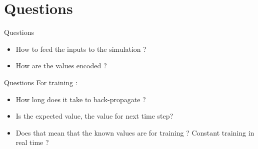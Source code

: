 \documentclass{beamer}
\begin{document}

\section{Questions}
\begin{frame}{Questions}
  \begin{itemize}
    \item How to feed the inputs to the simulation ?
    \item How are the values encoded ?
  \end{itemize}
\end{frame}

\begin{frame}{Questions}
  For training :
  \begin{itemize}
    \item How long does it take to back-propagate ?
    \item Is the expected value, the value for next time step?
    \item Does that mean that the known values are for training ? Constant training in real time ?
  \end{itemize}
\end{frame}
\end{document}
